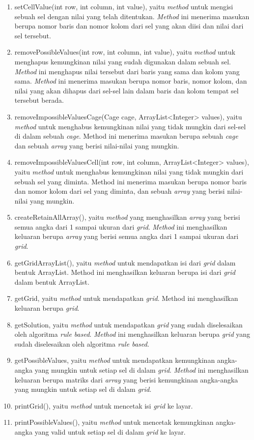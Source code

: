 \begin{enumerate}
\item setCellValue(int row, int column, int value), yaitu \textit{method} untuk mengisi sebuah sel dengan nilai yang telah ditentukan. \textit{Method} ini menerima masukan berupa nomor baris dan nomor kolom dari sel yang akan diisi dan nilai dari sel tersebut.
\item removePossibleValues(int row, int column, int value), yaitu \textit{method} untuk menghapus kemungkinan nilai yang sudah digunakan dalam sebuah sel. \textit{Method} ini menghapus nilai tersebut dari baris yang sama dan kolom yang sama. \textit{Method} ini menerima masukan berupa nomor baris, nomor kolom, dan nilai yang akan dihapus dari sel-sel lain dalam baris dan kolom tempat sel tersebut berada.
\item removeImpossibleValuesCage(Cage cage, ArrayList<Integer> values), yaitu \textit{method} untuk menghabus kemungkinan nilai yang tidak mungkin dari sel-sel di dalam sebuah \textit{cage}. Method ini menerima masukan berupa sebuah \textit{cage} dan sebuah \textit{array} yang berisi nilai-nilai yang mungkin.
\item removeImpossibleValuesCell(int row, int column, ArrayList<Integer> values), yaitu \textit{method} untuk menghabus kemungkinan nilai yang tidak mungkin dari sebuah sel yang diminta. Method ini menerima masukan berupa nomor baris dan nomor kolom dari sel yang diminta, dan sebuah \textit{array} yang berisi nilai-nilai yang mungkin.
\item createRetainAllArray(), yaitu \textit{method} yang menghasilkan \textit{array} yang berisi semua angka dari 1 sampai ukuran dari \textit{grid}. \textit{Method} ini menghasilkan keluaran berupa \textit{array} yang berisi semua angka dari 1 sampai ukuran dari \textit{grid}.
\item getGridArrayList(), yaitu \textit{method} untuk mendapatkan isi dari \textit{grid} dalam bentuk ArrayList. Method ini menghasilkan keluaran berupa isi dari \textit{grid} dalam bentuk ArrayList.
\item getGrid, yaitu \textit{method} untuk mendapatkan \textit{grid}. Method ini menghasilkan keluaran berupa \textit{grid}.
\item getSolution, yaitu \textit{method} untuk mendapatkan \textit{grid} yang sudah diselesaikan oleh algoritma \textit{rule based}. \textit{Method} ini menghasilkan keluaran berupa \textit{grid} yang sudah diselesaikan oleh algoritma \textit{rule based}.
\item getPossibleValues, yaitu \textit{method} untuk mendapatkan kemungkinan angka-angka yang mungkin untuk setiap sel di dalam \textit{grid}. \textit{Method} ini menghasilkan keluaran berupa matriks dari \textit{array} yang berisi kemungkinan angka-angka yang mungkin untuk setiap sel di dalam \textit{grid}.
\item printGrid(), yaitu \textit{method} untuk mencetak isi \textit{grid} ke layar.
\item printPossibleValues(), yaitu \textit{method} untuk mencetak kemungkinan angka-angka yang valid untuk setiap sel di dalam \textit{grid} ke layar.
\end{enumerate}

